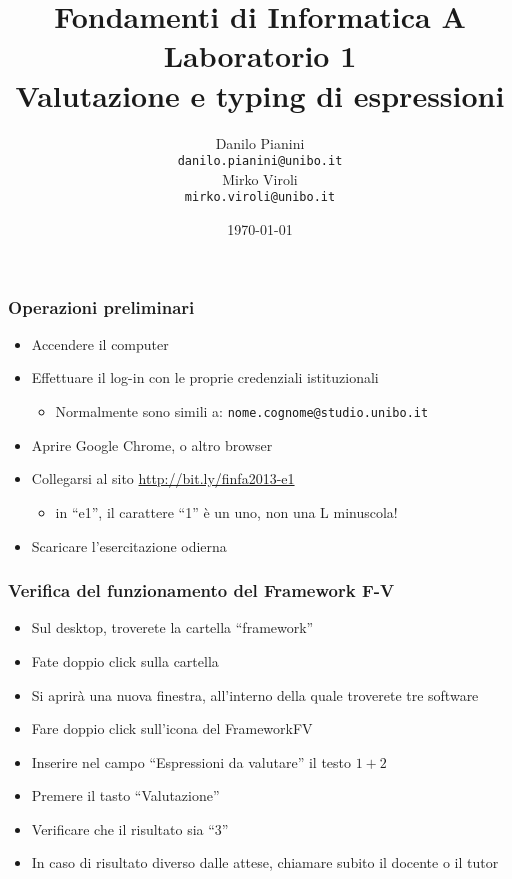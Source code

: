 \documentclass{beamer}
\begin{document}
\title[Lab1 - FV]{Fondamenti di Informatica A \\ Laboratorio 1 \\ Valutazione e typing di espressioni}
\author[Danilo Pianini]{Danilo Pianini\\\texttt{danilo.pianini@unibo.it} \\ \vspace{3pt} Mirko Viroli\\\texttt{mirko.viroli@unibo.it} }
\date[\today]{\today}

\frame{\titlepage} 

\begin{frame}
\frametitle{Operazioni preliminari}
\begin{itemize}
 \item Accendere il computer
 \item Effettuare il log-in con le proprie credenziali istituzionali
  \begin{itemize}
    \item Normalmente sono simili a: \texttt{nome.cognome@studio.unibo.it}
  \end{itemize}
 \item Aprire Google Chrome, o altro browser
 \item Collegarsi al sito \url{http://bit.ly/finfa2013-e1}
  \begin{itemize}
    \item in ``e1'', il carattere ``1'' è un uno, non una L minuscola!
  \end{itemize}
 \item Scaricare l'esercitazione odierna
\end{itemize}
\end{frame}

\begin{frame}
\frametitle{Verifica del funzionamento del Framework F-V}
\begin{itemize}
 \item Sul desktop, troverete la cartella ``framework''
 \item Fate doppio click sulla cartella
 \item Si aprirà una nuova finestra, all'interno della quale troverete tre software
 \item Fare doppio click sull'icona del FrameworkFV
 \item Inserire nel campo ``Espressioni da valutare'' il testo \texttt{$1+2$}
 \item Premere il tasto ``Valutazione''
 \item Verificare che il risultato sia ``3''
 \item In caso di risultato diverso dalle attese, chiamare subito il docente o il tutor
\end{itemize}
\end{frame}
\end{document}
